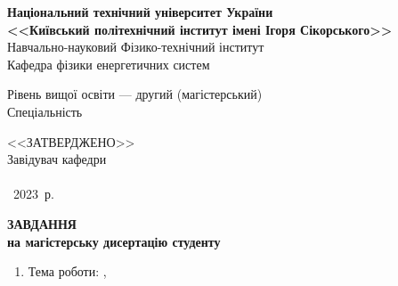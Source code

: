 %
%



\begin{spacing}{1.1}

\begin{center}{%
	\bfseries
	{Національний технічний університет України}\\
	{<<Київський політехнічний інститут імені Ігоря Сікорського>>}%
    }\\

	Навчально-науковий Фізико-технічний інститут\\
	Кафедра фізики енергетичних систем\\
\end{center}

\noindent Рівень вищої освіти --- другий (магістерський)\\
\makeatletter
\noindent Спеціальність  \@specialnist
\makeatother

\vspace*{1.5em}%
\noindent%
\hfill\begin{minipage}[t]{0.5\linewidth}
	<<ЗАТВЕРДЖЕНО>>\\
	Завідувач кафедри\\
	 \\
	 ~2023~р.\\
\end{minipage}

\begin{center}
	{\Large\bfseries ЗАВДАННЯ}\\
	{\bfseries на магістерську дисертацію студенту}\\
\end{center}
\makeatletter%
\noindent{} 
\makeatother%

\begin{enumerate}[label*=\arabic*., labelindent=0pt, itemindent=0cm]
	\makeatletter%
	\item Тема роботи: \@title,


\end{enumerate}
\end{spacing}
